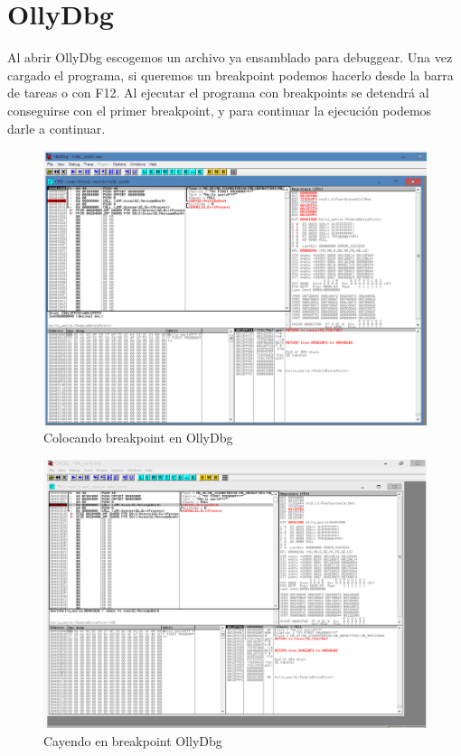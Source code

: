 

\section{OllyDbg}
Al abrir OllyDbg escogemos un archivo ya ensamblado para debuggear. Una vez
cargado el programa, si queremos un breakpoint podemos hacerlo desde la barra de
tareas o con F12. Al ejecutar el programa con breakpoints se detendrá al
conseguirse con el primer breakpoint, y para continuar la ejecución podemos
darle a continuar.

\begin{figure}[ht]
  \includegraphics[width=\linewidth]{figs/fig6.png}
  \caption{Colocando breakpoint en OllyDbg}
  \label{fig:6}
\end{figure}

\begin{figure}[ht]
  \includegraphics[width=\linewidth]{figs/fig7.png}
  \caption{Cayendo en breakpoint OllyDbg}
  \label{fig:7}
\end{figure}

